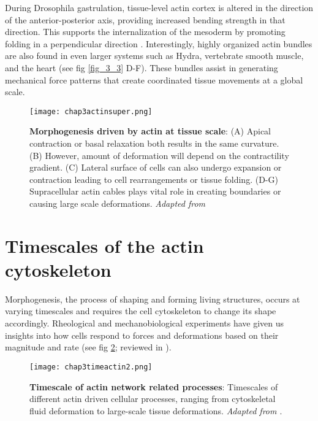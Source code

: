 During Drosophila gastrulation, tissue-level actin cortex is altered in the direction of the anterior-posterior axis, providing increased bending strength in that direction. This supports the internalization of the mesoderm by promoting folding in a perpendicular direction \cite{yevick2019}. Interestingly, highly organized actin bundles are also found in even larger systems such as Hydra, vertebrate smooth muscle, and the heart \cite{maroudas-sacks2021, palmer2021, cetera2014, helm2005} (see fig \ref{fig_3_3} D-F). These bundles assist in generating mechanical force patterns that create coordinated tissue movements at a global scale.


\begin{figure}
	\centering
	\texttt{[image: chap3actinsuper.png]}
	\caption{\label{fig_3_4} \textbf{Morphogenesis driven by actin at tissue scale}: (A) Apical contraction or basal relaxation both results in the same curvature. (B) However, amount of deformation will depend on the contractility gradient. (C) Lateral surface of cells can also undergo expansion or contraction leading to cell rearrangements or tissue folding. (D-G) Supracellular actin cables plays vital role in creating boundaries or causing large scale deformations. \textit{Adapted from \cite{clarke2021}}
	}
\end{figure}

\hypertarget{timescales-of-the-actin-cytoskeleton}{%
	\section{Timescales of the actin
		cytoskeleton}\label{timescales-of-the-actin-cytoskeleton}}

Morphogenesis, the process of shaping and forming living structures, occurs at varying timescales and requires the cell cytoskeleton to change its shape accordingly. Rheological and mechanobiological experiments have given us insights into how cells respond to forces and deformations based on their magnitude and rate (see fig \ref{fig_3_5}; reviewed in \cite{wyatt2016}).

\begin{figure}
	\centering
	\texttt{[image: chap3timeactin2.png]}
	\caption{\label{fig_3_5} 
		\textbf{Timescale of actin network related processes}: Timescales of different actin driven cellular processes, ranging from cytoskeletal fluid deformation to large-scale tissue deformations. \textit{Adapted from \cite{kelkar2020}}.}
\end{figure}

